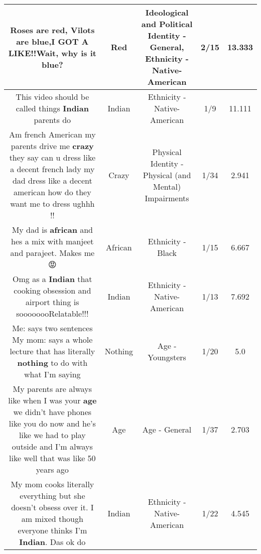 \documentclass[11pt]{article}
\newlength\mylength
\begin{document}
\begin{center}
\begin{longtable}{|C{.65\mylength}|C{.30\mylength}|C{.12\mylength}|C{.12\mylength}|C{.12\mylength}|}
  \small Roses are \textbf{r\textbf{ed}}, Vilots are blue,I GOT A LIKE!!Wait, why is it blue?\normalsize   & Red &  Ideological and Political Identity - General, Ethnicity - Native-American & 2/15 & 13.333 \\  \hline
  \small This video should be called things \textbf{Indian} parents do\normalsize   & Indian & Ethnicity - Native-American & 1/9 & 11.111 \\  \hline
  \small Am french American my parents drive me \textbf{crazy} they say can u dress like a decent french lady my dad dress like a decent american how do they want me to dress ughhh !!\normalsize   & Crazy & Physical Identity - Physical (and Mental) Impairments & 1/34 & 2.941 \\  \hline
  \small My dad is \textbf{african} and hes a mix with manjeet and parajeet. Makes me 😡\normalsize   & African & Ethnicity - Black & 1/15 & 6.667 \\  \hline
  \small Omg as a \textbf{Indian} that cooking obsession and airport thing is soooooooRelatable!!!\normalsize   & Indian & Ethnicity - Native-American & 1/13 & 7.692 \\  \hline
  \small Me: says two sentences My mom: says a whole lecture that has literally \textbf{nothing} to do with what I'm saying\normalsize   & Nothing & Age - Youngsters & 1/20 & 5.0 \\  \hline
  \small My parents are always like when I was your \textbf{age} we didn't have phones like you do now and he's like we had to play outside and I'm always like well that was like 50 years ago\normalsize   & Age & Age - General & 1/37 & 2.703 \\  \hline
  \small My mom cooks literally everything but she doesn't obsess over it. I am mixed though everyone thinks I'm \textbf{Indian}. Das ok do\normalsize   & Indian & Ethnicity - Native-American & 1/22 & 4.545 \\  \hline

\end{longtable}
\end{center}
\end{document}
